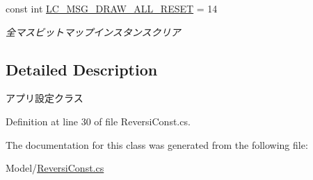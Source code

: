 \begin{DoxyCompactItemize}
\mbox{\label{class_reversi_form_1_1_reversi_const_a7d19252a69550114ccefe0f69fc3850f}} 
const int \hyperlink{class_reversi_form_1_1_reversi_const_a7d19252a69550114ccefe0f69fc3850f}{L\+C\+\_\+\+M\+S\+G\+\_\+\+D\+R\+A\+W\+\_\+\+A\+L\+L\+\_\+\+R\+E\+S\+ET} = 14
\begin{DoxyCompactList}\small\item\em 全マスビットマップインスタンスクリア \end{DoxyCompactList}\end{DoxyCompactItemize}


\subsection{Detailed Description}
アプリ設定クラス 

Definition at line 30 of file Reversi\+Const.\+cs.



The documentation for this class was generated from the following file\+:\begin{DoxyCompactItemize}
\item 
Model/\hyperlink{_reversi_const_8cs}{Reversi\+Const.\+cs}\end{DoxyCompactItemize}
